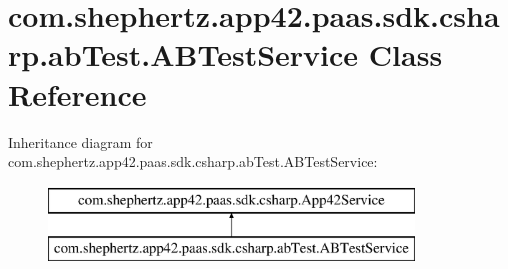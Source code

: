 \hypertarget{classcom_1_1shephertz_1_1app42_1_1paas_1_1sdk_1_1csharp_1_1ab_test_1_1_a_b_test_service}{\section{com.\+shephertz.\+app42.\+paas.\+sdk.\+csharp.\+ab\+Test.\+A\+B\+Test\+Service Class Reference}
\label{classcom_1_1shephertz_1_1app42_1_1paas_1_1sdk_1_1csharp_1_1ab_test_1_1_a_b_test_service}
}
Inheritance diagram for com.\+shephertz.\+app42.\+paas.\+sdk.\+csharp.\+ab\+Test.\+A\+B\+Test\+Service\+:\begin{figure}[H]
\begin{center}
\leavevmode
\includegraphics[height=2.000000cm]{classcom_1_1shephertz_1_1app42_1_1paas_1_1sdk_1_1csharp_1_1ab_test_1_1_a_b_test_service}
\end{center}
\end{figure}
